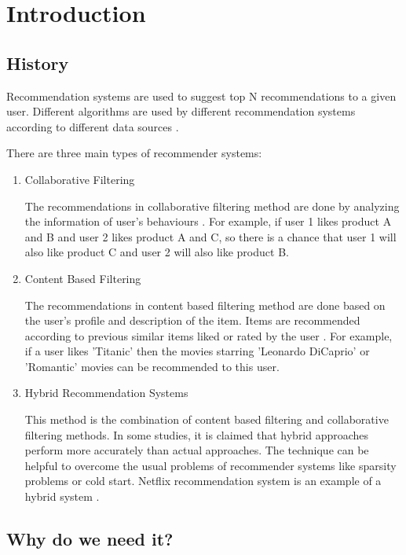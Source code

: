 \chapter{Introduction}
\label{ch:introduction}

\section{History}

Recommendation systems are used to suggest top N recommendations to a given user. Different algorithms are used by different recommendation systems according to different data sources \cite{recommendation-engines}.

There are three main types of recommender systems:


\begin{enumerate}
\item Collaborative Filtering

The recommendations in collaborative filtering method are done by analyzing the information of user's behaviours \cite{recommendation-engines}. For example, if user 1 likes product A and B and user 2 likes product A and C, so there is a chance that user 1 will also like product C and user 2 will also like product B.


\item Content Based Filtering

The recommendations in content based filtering method are done based on the user's profile and description of the item. Items are recommended according to previous similar items liked or rated by the user \cite{recommendation-engines}. For example, if a user likes 'Titanic' then the movies starring 'Leonardo DiCaprio' or 'Romantic' movies can be recommended to this user.


\item Hybrid Recommendation Systems

This method is the combination of content based filtering and collaborative filtering methods. In some studies, it is claimed that hybrid approaches perform more accurately than actual approaches. The technique can be helpful to overcome the usual problems of recommender systems like sparsity problems or cold start. Netflix recommendation system is an example of a hybrid system \cite{recommendation-engines}.
\end{enumerate}

\section{Why do we need it?}

